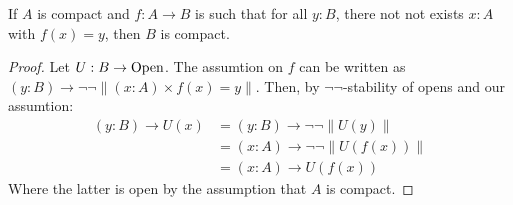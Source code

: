 \begin{lemma}
  \label{not-not-surjection-compact}
  If $A$ is compact and $f:A\to B$ is such that for all $y:B$,
  there not not exists $x:A$ with $f(x)=y$,
  then $B$ is compact.
\end{lemma}

\begin{proof}
  Let $U:B\to\mathrm{Open}$.
  The assumtion on $f$ can be written as $(y:B)\to \neg\neg \| (x:A)\times f(x)=y \|$.
  Then, by $\neg\neg$-stability of opens and our assumtion:
  \begin{align*}
    (y:B)\to U(x) &= (y:B)\to \neg\neg \| U(y) \| \\
                  &= (x:A)\to \neg\neg \| U(f(x)) \| \\
                  &= (x:A)\to U(f(x))
  \end{align*}
  Where the latter is open by the assumption that $A$ is compact.
\end{proof}